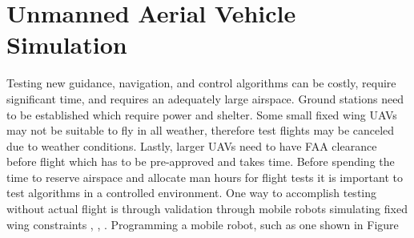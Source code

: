 \documentclass[numbered,pdftex]{ohio-etd}
\begin{document}



\section{Unmanned Aerial Vehicle Simulation}
Testing new guidance, navigation, and control algorithms can be costly, require significant time, and requires an adequately large airspace. Ground stations need to be established which require power and shelter. Some small fixed wing UAVs may not be suitable to fly in all weather, therefore test flights may be canceled due to weather conditions. Lastly, larger UAVs need to have FAA clearance before flight which has to be pre-approved and takes time. Before spending the time to reserve airspace and allocate man hours for flight tests it is important to test algorithms in a controlled environment. One way to accomplish testing without actual flight is through validation through mobile robots simulating fixed wing constraints \cite{ren_experimental_2007}, \cite{louali_designing_2014}, \cite{louali_experimental_2016}. Programming a mobile robot, such as one shown in Figure
\end{document}
